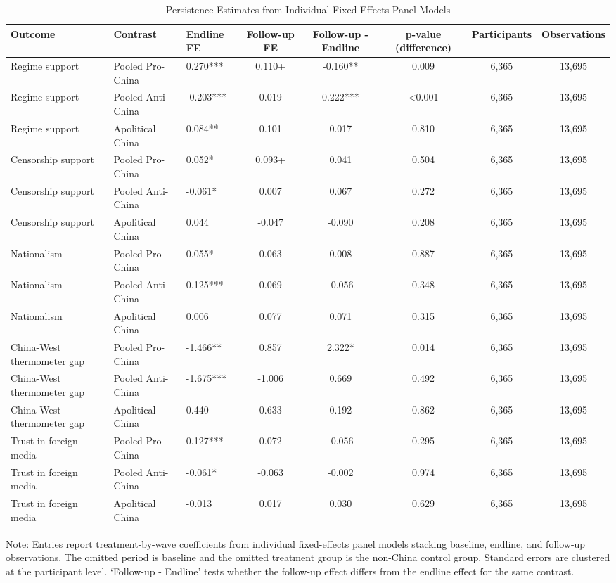 \begin{table}[H]
\centering
\caption{Persistence Estimates from Individual Fixed-Effects Panel Models}
\label{tab:persistence_panel_fe}
\footnotesize
\begin{threeparttable}
\begin{tabular}{lllccccc}
\toprule
Outcome & Contrast & Endline FE & Follow-up FE & Follow-up - Endline & p-value (difference) & Participants & Observations \\
\midrule
Regime support & Pooled Pro-China & 0.270*** & 0.110+ & -0.160** & 0.009 & 6,365 & 13,695 \\
Regime support & Pooled Anti-China & -0.203*** & 0.019 & 0.222*** & <0.001 & 6,365 & 13,695 \\
Regime support & Apolitical China & 0.084** & 0.101 & 0.017 & 0.810 & 6,365 & 13,695 \\
Censorship support & Pooled Pro-China & 0.052* & 0.093+ & 0.041 & 0.504 & 6,365 & 13,695 \\
Censorship support & Pooled Anti-China & -0.061* & 0.007 & 0.067 & 0.272 & 6,365 & 13,695 \\
Censorship support & Apolitical China & 0.044 & -0.047 & -0.090 & 0.208 & 6,365 & 13,695 \\
Nationalism & Pooled Pro-China & 0.055* & 0.063 & 0.008 & 0.887 & 6,365 & 13,695 \\
Nationalism & Pooled Anti-China & 0.125*** & 0.069 & -0.056 & 0.348 & 6,365 & 13,695 \\
Nationalism & Apolitical China & 0.006 & 0.077 & 0.071 & 0.315 & 6,365 & 13,695 \\
China-West thermometer gap & Pooled Pro-China & -1.466** & 0.857 & 2.322* & 0.014 & 6,365 & 13,695 \\
China-West thermometer gap & Pooled Anti-China & -1.675*** & -1.006 & 0.669 & 0.492 & 6,365 & 13,695 \\
China-West thermometer gap & Apolitical China & 0.440 & 0.633 & 0.192 & 0.862 & 6,365 & 13,695 \\
Trust in foreign media & Pooled Pro-China & 0.127*** & 0.072 & -0.056 & 0.295 & 6,365 & 13,695 \\
Trust in foreign media & Pooled Anti-China & -0.061* & -0.063 & -0.002 & 0.974 & 6,365 & 13,695 \\
Trust in foreign media & Apolitical China & -0.013 & 0.017 & 0.030 & 0.629 & 6,365 & 13,695 \\
\bottomrule
\end{tabular}
\begin{tablenotes}[flushleft]
\footnotesize
\item Note: Entries report treatment-by-wave coefficients from individual fixed-effects panel models stacking baseline, endline, and follow-up observations. The omitted period is baseline and the omitted treatment group is the non-China control group. Standard errors are clustered at the participant level. `Follow-up - Endline' tests whether the follow-up effect differs from the endline effect for the same contrast.
\end{tablenotes}
\end{threeparttable}
\end{table}
